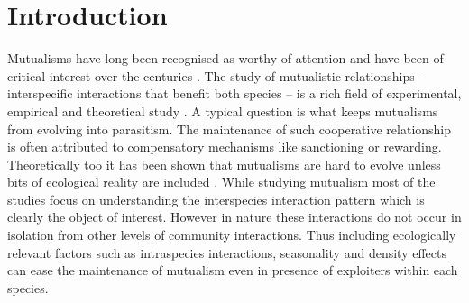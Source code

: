 \documentclass[12pt]{article}
\begin{document}
\section{Introduction}
Mutualisms have long been recognised as worthy of attention and have been of critical interest over the centuries \citep{aristotle:book:350,janzen:bookchapter:1985,bronstein:book:2003}.
The study of mutualistic relationships -- interspecific interactions that benefit both species -- is a rich field of experimental, empirical and theoretical study 
\citep{boucher:book:1985,hinton:PTENHS:1951,wilson:AmNat:1983,bronstein:QRB:1994,poulin:JTB:1995,noe:book:2001,johnstone:ECL:2002,pierce:ARE:2002,kiers:Nature:2003,bergstrom:PNAS:2003,hoeksema:AmNat:2003,bshary:ASB:2004,akcay:PRSB:2007,bshary:Nature:2008,gokhale:PRSB:2012,archetti:JTB:2013}.
A typical question is what keeps mutualisms from evolving into parasitism.
The maintenance of such cooperative relationship is often attributed to compensatory mechanisms like sanctioning or rewarding.
Theoretically too it has been shown that mutualisms are hard to evolve unless bits of ecological reality are included \cite{doebeli:PNAS:1998}.
While studying mutualism most of the studies focus on understanding the interspecies interaction pattern which is clearly the object of interest.
However in nature these interactions do not occur in isolation from other levels of community interactions.
Thus including ecologically relevant factors such as intraspecies interactions, seasonality and density effects can ease the maintenance of mutualism even in presence of exploiters within each species. 
\end{document}

